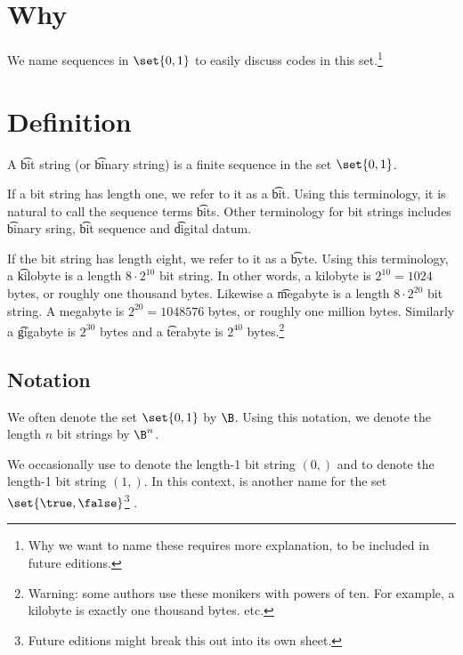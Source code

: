 

\section*{Why}

We name sequences in $\set{0, 1}$ to easily discuss codes in this set.\footnote{Why we want to name these requires more explanation, to be included in future editions.}

\section*{Definition}

A \t{bit string} (or \t{binary string}) is a finite sequence in the set $\set{0, 1}$.

If a bit string has length one, we refer to it as a \t{bit}.
Using this terminology, it is natural to call the sequence terms \t{bits}.
Other terminology for bit strings includes \t{binary sring}, \t{bit sequence} and \t{digital datum}.

If the bit string has length eight, we refer to it as a \t{byte}.
Using this terminology, a \t{kilobyte} is a length $8 \cdot 2^{10}$ bit string.
In other words, a kilobyte is $2^{10} = 1024$ bytes, or roughly one thousand bytes.
Likewise a \t{megabyte} is a length $8 \cdot 2^{20}$ bit string.
A megabyte is $2^{20} = 1048576$ bytes, or roughly one million bytes.
Similarly a \t{gigabyte} is $2^{30}$ bytes and a \t{terabyte} is $2^{40}$ bytes.\footnote{Warning: some authors use these monikers with powers of ten. For example, a kilobyte is exactly one thousand bytes. etc.}

\subsection*{Notation}

We often denote the set $\set{0,1}$ by $\B$.
Using this notation, we denote the length $n$ bit strings by $\B^n$.

We occasionally use \false to denote the length-1 bit string $(0,)$ and \true to denote the length-1 bit string $(1,)$.
In this context, \bool is another name for the set $\set{\true, \false}$\footnote{Future editions might break this out into its own sheet.}
.

\blankpage
